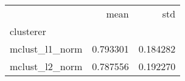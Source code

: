 \begin{tabular}{lrr}
\toprule
{} &      mean &       std \\
clusterer      &           &           \\
\midrule
mclust\_l1\_norm &  0.793301 &  0.184282 \\
mclust\_l2\_norm &  0.787556 &  0.192270 \\
\bottomrule
\end{tabular}

